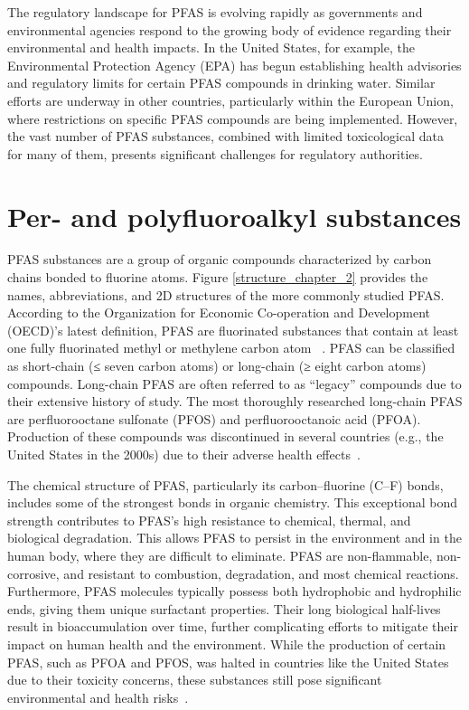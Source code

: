 The regulatory landscape for PFAS is evolving rapidly as governments and environmental agencies respond to the growing body of evidence regarding their environmental and health impacts. In the United States, for example, the Environmental Protection Agency (EPA) has begun establishing health advisories and regulatory limits for certain PFAS compounds in drinking water. Similar efforts are underway in other countries, particularly within the European Union, where restrictions on specific PFAS compounds are being implemented. However, the vast number of PFAS substances, combined with limited toxicological data for many of them, presents significant challenges for regulatory authorities. 

\section{Per- and polyfluoroalkyl substances} \label{sec:pfas_intro}

PFAS substances are a group of organic compounds characterized by carbon chains bonded to fluorine atoms. Figure \ref{structure_chapter_2} provides the names, abbreviations, and 2D structures of the more commonly studied PFAS. According to the Organization for Economic Co-operation and Development (OECD)’s latest definition, PFAS are fluorinated substances that contain at least one fully fluorinated methyl or methylene carbon atom ~\cite{2}. PFAS can be classified as short-chain (≤ seven carbon atoms) or long-chain (≥ eight carbon atoms) compounds. Long-chain PFAS are often referred to as “legacy” compounds due to their extensive history of study. The most thoroughly researched long-chain PFAS are perfluorooctane sulfonate (PFOS) and perfluorooctanoic acid (PFOA). Production of these compounds was discontinued in several countries (e.g., the United States in the 2000s) due to their adverse health effects~\cite{2,3}.

The chemical structure of PFAS, particularly its carbon–fluorine (C–F) bonds, includes some of the strongest bonds in organic chemistry. This exceptional bond strength contributes to PFAS’s high resistance to chemical, thermal, and biological degradation. This allows PFAS to persist in the environment and in the human body, where they are difficult to eliminate. PFAS are non-flammable, non-corrosive, and resistant to combustion, degradation, and most chemical reactions. Furthermore, PFAS molecules typically possess both hydrophobic and hydrophilic ends, giving them unique surfactant properties. Their long biological half-lives result in bioaccumulation over time, further complicating efforts to mitigate their impact on human health and the environment. While the production of certain PFAS, such as PFOA and PFOS, was halted in countries like the United States due to their toxicity concerns, these substances still pose significant environmental and health risks~\cite{PFOA_PFOS_risk}.

